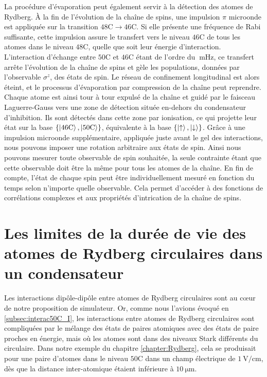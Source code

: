La procédure d'évaporation peut également servir à la détection des atomes de Rydberg.
\`A la fin de l'évolution de la chaîne de spins, une impulsion $\pi$ microonde est appliquée sur la transition $\mathrm{48C}\rightarrow\mathrm{46C}$.
Si elle présente une fréquence de Rabi suffisante, cette impulsion assure le transfert vers le niveau $\mathrm{46C}$ de tous les atomes dans le niveau $\mathrm{48C}$, quelle que soit leur énergie d'interaction.
L'interaction d'échange entre $\mathrm{50C}$ et $\mathrm{46C}$ étant de l'ordre du $\SI{}{\milli\hertz}$, ce transfert arrête l'évolution de la chaîne de spins et \og gèle \fg{} les populations, données par l'observable $\sigma^z$, des états de spin.
Le réseau de confinement longitudinal est alors éteint, et le processus d'évaporation par compression de la chaîne peut reprendre.
Chaque atome est ainsi tour à tour expulsé de la chaîne et guidé par le faisceau Laguerre-Gauss vers une zone de détection située en-dehors du condensateur d'inhibition.
Ils sont détectés dans cette zone par ionisation, ce qui projette leur état sur la base $\{\ket{\mathrm{46C}},\ket{\mathrm{50C}}\}$, équivalente à la base $\{\ket{\uparrow},\ket{\downarrow} \}$.
Grâce à une impulsion microonde supplémentaire, appliquée juste avant le gel des interactions, nous pouvons imposer une rotation arbitraire aux états de spin. Ainsi nous pouvons mesurer toute observable de spin souhaitée, la seule contrainte étant que cette observable doit être la même pour tous les atomes de la chaîne.
En fin de compte, l'état de chaque spin peut être individuellement mesuré en fonction du temps selon n'importe quelle observable.
Cela permet d'accéder à des fonctions de corrélations complexes et aux propriétés d'intrication de la chaîne de spins.

\section{Les limites de la durée de vie des atomes de Rydberg circulaires dans un condensateur}
\noindent Les interactions dipôle-dipôle entre atomes de Rydberg circulaires sont au c\oe ur de notre proposition de simulateur.
Or, comme nous l'avions évoqué en \ref{subsec:interac50C_I}, les interactions entre atomes de Rydberg circulaires sont compliquées par le mélange des états de paires atomiques avec des états de paire proches en énergie, mais où les atomes sont dans des niveaux Stark différents du circulaire.
Dans notre exemple du chapitre \ref{chapter:Rydberg}, cela se produisait pour une paire d'atomes dans le niveau $\mathrm{50C}$ dans un champ électrique de $\SI{1}{\V/\cm}$, dès que la distance inter-atomique étaient inférieure à $\SI{10}{\um}$.

